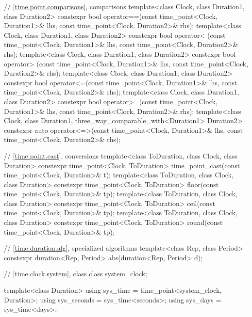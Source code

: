 \begin{codeblock}
{{    // \ref{time.point.comparisons},  comparisons
    template<class Clock, class Duration1, class Duration2>
       constexpr bool operator==(const time_point<Clock, Duration1>& lhs,
                                 const time_point<Clock, Duration2>& rhs);
    template<class Clock, class Duration1, class Duration2>
       constexpr bool operator< (const time_point<Clock, Duration1>& lhs,
                                 const time_point<Clock, Duration2>& rhs);
    template<class Clock, class Duration1, class Duration2>
       constexpr bool operator> (const time_point<Clock, Duration1>& lhs,
                                 const time_point<Clock, Duration2>& rhs);
    template<class Clock, class Duration1, class Duration2>
       constexpr bool operator<=(const time_point<Clock, Duration1>& lhs,
                                 const time_point<Clock, Duration2>& rhs);
    template<class Clock, class Duration1, class Duration2>
       constexpr bool operator>=(const time_point<Clock, Duration1>& lhs,
                                 const time_point<Clock, Duration2>& rhs);
    template<class Clock, class Duration1, three_way_comparable_with<Duration1> Duration2>
       constexpr auto operator<=>(const time_point<Clock, Duration1>& lhs,
                                  const time_point<Clock, Duration2>& rhs);

    // \ref{time.point.cast}, conversions
    template<class ToDuration, class Clock, class Duration>
      constexpr time_point<Clock, ToDuration>
        time_point_cast(const time_point<Clock, Duration>& t);
    template<class ToDuration, class Clock, class Duration>
      constexpr time_point<Clock, ToDuration> floor(const time_point<Clock, Duration>& tp);
    template<class ToDuration, class Clock, class Duration>
      constexpr time_point<Clock, ToDuration> ceil(const time_point<Clock, Duration>& tp);
    template<class ToDuration, class Clock, class Duration>
      constexpr time_point<Clock, ToDuration> round(const time_point<Clock, Duration>& tp);

    // \ref{time.duration.alg}, specialized algorithms
    template<class Rep, class Period>
      constexpr duration<Rep, Period> abs(duration<Rep, Period> d);

    // \ref{time.clock.system}, class 
    class system_clock;

    template<class Duration>
      using sys_time  = time_point<system_clock, Duration>;
    using sys_seconds = sys_time<seconds>;
    using sys_days    = sys_time<days>;

}}
\end{codeblock}
